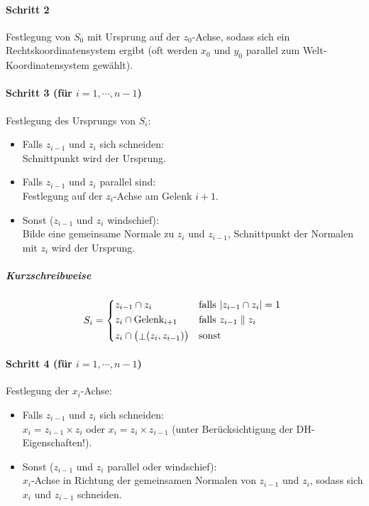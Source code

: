 \documentclass[a4paper, 11pt, accentcolor = tud3b]{tudreport}
\begin{document}
					\paragraph{Schritt 2}
						Festlegung von \(S_0\) mit Ursprung auf der \(z_0\)-Achse, sodass sich ein Rechtskoordinatensystem ergibt (oft werden \(x_0\) und \(y_0\) parallel zum Welt-Koordinatensystem gewählt).
					
					\paragraph{Schritt 3 (für \( i = 1, \cdots, n - 1 \))}
						Festlegung des Ursprungs von \(S_i\):
						\begin{itemize}
							\item Falls \(z_{i - 1}\) und \(z_i\) sich schneiden: \\ Schnittpunkt wird der Ursprung.
							\item Falls \(z_{i - 1}\) und \(z_i\) parallel sind: \\ Festlegung auf der \(z_i\)-Achse am Gelenk \(i + 1\).
							\item Sonst (\(z_{i - 1}\) und \(z_i\) windschief): \\ Bilde eine gemeinsame Normale zu \(z_i\) und \(z_{i - 1}\), Schnittpunkt der Normalen mit \(z_i\) wird der Ursprung.
						\end{itemize}
					
						\subparagraph{Kurzschreibweise}
						\begin{equation*}
							S_i =
								\begin{cases*}
									z_{i - 1} \cap z_i & falls \( \lvert z_{i - 1} \cap z_i \rvert = 1 \) \\
									z_i \cap \text{Gelenk}_{i + 1} & falls \( z_{i - 1} \parallel z_i \) \\
									z_i \cap \big(\raisebox{-1pt}{\(\bot\)}(z_i, z_{i - 1})\big) & sonst
								\end{cases*}
						\end{equation*}
					
					\paragraph{Schritt 4 (für \( i = 1, \cdots, n - 1 \))}
						Festlegung der \(x_i\)-Achse:
						\begin{itemize}
							\item Falls \(z_{i - 1}\) und \(z_i\) sich schneiden: \\ \( x_i = z_{i - 1} \times z_i \) oder \( x_i = z_i \times z_{i - 1} \) (unter Berücksichtigung der DH-Eigenschaften!).
							\item Sonst (\(z_{i - 1}\) und \(z_i\) parallel oder windschief): \\ \(x_i\)-Achse in Richtung der gemeinsamen Normalen von \(z_{i - 1}\) und \(z_i\), sodass sich \(x_i\) und \(z_{i - 1}\) schneiden.
						\end{itemize}
					
\end{document}
